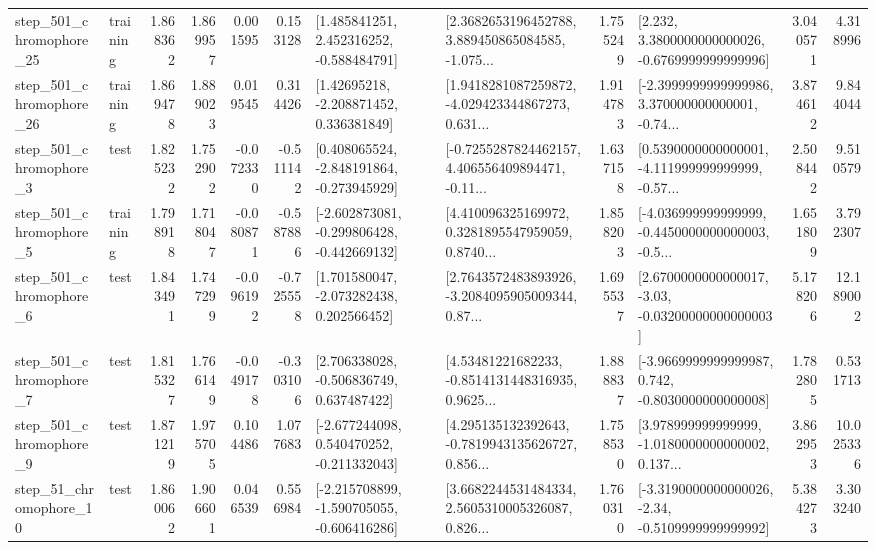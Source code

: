 \begin{tabular}{llrrrrllrlrr}
  step\_501\_chromophore\_25 &  training &      1.868362 &    1.869957 &      0.001595 &  0.153128 &    [1.485841251, 2.452316252, -0.588484791] &  [2.3682653196452788, 3.889450865084585, -1.075... &       1.755249 &   [2.232, 3.3800000000000026, -0.6769999999999996] &            3.040571 &          4.318996 \\
  step\_501\_chromophore\_26 &  training &      1.869478 &    1.889023 &      0.019545 &  0.314426 &     [1.42695218, -2.208871452, 0.336381849] &  [1.9418281087259872, -4.029423344867273, 0.631... &       1.914783 &  [-2.3999999999999986, 3.370000000000001, -0.74... &            3.874612 &          9.844044 \\
   step\_501\_chromophore\_3 &      test &      1.825232 &    1.752902 &     -0.072330 & -0.511142 &   [0.408065524, -2.848191864, -0.273945929] &  [-0.7255287824462157, 4.406556409894471, -0.11... &       1.637158 &  [0.5390000000000001, -4.111999999999999, -0.57... &            2.508442 &          9.510579 \\
   step\_501\_chromophore\_5 &  training &      1.798918 &    1.718047 &     -0.080871 & -0.587886 &  [-2.602873081, -0.299806428, -0.442669132] &  [4.410096325169972, 0.3281895547959059, 0.8740... &       1.858203 &  [-4.036999999999999, -0.4450000000000003, -0.5... &            1.651809 &          3.792307 \\
   step\_501\_chromophore\_6 &      test &      1.843491 &    1.747299 &     -0.096192 & -0.725558 &    [1.701580047, -2.073282438, 0.202566452] &  [2.7643572483893926, -3.2084095905009344, 0.87... &       1.695537 &  [2.6700000000000017, -3.03, -0.03200000000000003] &            5.178206 &         12.189002 \\
   step\_501\_chromophore\_7 &      test &      1.815327 &    1.766149 &     -0.049178 & -0.303106 &    [2.706338028, -0.506836749, 0.637487422] &  [4.53481221682233, -0.8514131448316935, 0.9625... &       1.888837 &  [-3.9669999999999987, 0.742, -0.8030000000000008] &            1.782805 &          0.531713 \\
   step\_501\_chromophore\_9 &      test &      1.871219 &    1.975705 &      0.104486 &  1.077683 &   [-2.677244098, 0.540470252, -0.211332043] &  [4.295135132392643, -0.7819943135626727, 0.856... &       1.758530 &  [3.978999999999999, -1.0180000000000002, 0.137... &            3.862953 &         10.025336 \\
   step\_51\_chromophore\_10 &      test &      1.860062 &    1.906601 &      0.046539 &  0.556984 &  [-2.215708899, -1.590705055, -0.606416286] &  [3.6682244531484334, 2.5605310005326087, 0.826... &       1.760310 &  [-3.3190000000000026, -2.34, -0.5109999999999992] &            5.384273 &          3.303240 \\

\end{tabular}
